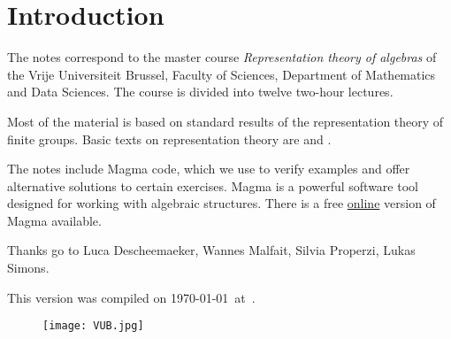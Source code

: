 \thispagestyle{plain}
\section*{Introduction}

The notes correspond to the master  
course \emph{Representation theory of algebras} of the 
Vrije Universiteit Brussel, 
Faculty of Sciences, 
Department of Mathematics and Data Sciences. The course
is divided into twelve two-hour lectures. 

Most of the material is based on standard 
results of the representation theory of finite groups. 
Basic texts on representation theory are \cite{MR1369573} 
and \cite{MR2270898}. 

The notes include Magma code, which we use to verify examples and offer alternative solutions to certain exercises. Magma \cite{zbMATH01077111} is a powerful software tool designed for working with algebraic structures. There is a free \href{https://magma.maths.usyd.edu.au/calc/}{online} version of Magma available.


Thanks go to Luca Descheemaeker, Wannes Malfait, Silvia Properzi, Lukas Simons.  



This version 
was compiled on \today~at~\currenttime.


 \begin{figure}[b]
     \texttt{[image: VUB.jpg]}
 \end{figure}